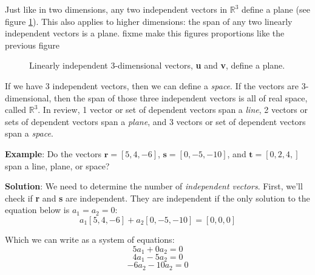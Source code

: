 Just like in two dimensions, any two independent vectors in $\mathbb{R}^3$ 
define a plane (see figure \ref{fig:plane}). This also applies to higher 
dimensions: the span of any two linearly independent vectors is a plane. fixme make this figures proportions like the previous figure

\begin{figure}[htbp]
\centering
{}
\caption{Linearly independent 3-dimensional vectors, \textbf{u} and \textbf{v}, 
define a plane.}
\label{fig:plane}
\end{figure}

If we have 3 independent vectors, then we can define a \textit{space}. If the 
vectors are 3-dimensional, then the span of those three independent vectors is 
all of real space, called $\mathbb{R}^3$. In review, 1 vector or set of 
dependent vectors span a \textit{line}, 2 vectors or sets of dependent vectors 
span a \textit{plane}, and 3 vectors or set of dependent vectors span a 
\textit{space}. 

\textbf{Example}: Do the vectors $\mathbf{r} = \left[ 5, 4, -6 \right]$, 
$\mathbf{s} = \left[ 0, -5, -10 \right]$, and $\mathbf{t} = \left[ 0, 2, 4, 
\right]$ span a line, plane, or space?

\textbf{Solution}: We need to determine the number of \textit{independent 
vectors}. First, we'll check if \textbf{r} and \textbf{s} are independent. 
They are independent if the only solution to the equation below is $a_1 = a_2 
= 0$:
$$a_1 \left[5, 4, -6 \right] + a_2 \left[ 0, -5, -10 \right] = \left[ 0, 0, 0 
\right]$$

Which we can write as a system of equations:
$$5a_1 + 0a_2 = 0$$
$$4a_1 - 5a_2 = 0$$
$$-6a_2 -10a_2 = 0$$

